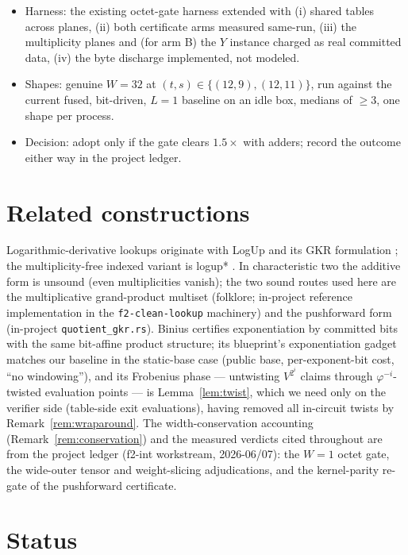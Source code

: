 \documentclass[11pt]{article}
\theoremstyle{definition}
\begin{document}
\begin{itemize}
\item Harness: the existing octet-gate harness extended with (i) shared
tables across planes, (ii) both certificate arms measured same-run,
(iii) the multiplicity planes and (for arm B) the $Y$ instance charged
as real committed data, (iv) the byte discharge implemented, not
modeled.
\item Shapes: genuine $W{=}32$ at $(t,s)\in\{(12,9),(12,11)\}$, run
against the current fused, bit-driven, $L{=}1$ baseline on an idle box,
medians of $\ge 3$, one shape per process.
\item Decision: adopt only if the gate clears $1.5\times$ with adders;
record the outcome either way in the project ledger.
\end{itemize}

\section{Related constructions}\label{sec:related}

Logarithmic-derivative lookups originate with LogUp \cite{logup} and its
GKR formulation \cite{logupgkr}; the multiplicity-free indexed variant
is logup* \cite{logupstar}. In characteristic two the additive form is
unsound (even multiplicities vanish); the two sound routes used here are
the multiplicative grand-product multiset (folklore; in-project
reference implementation in the \texttt{f2-clean-lookup} machinery) and
the pushforward form (in-project \texttt{quotient\_gkr.rs}). Binius
\cite{binius} certifies exponentiation by committed bits with the same
bit-affine product structure; its blueprint's exponentiation gadget
\cite{biniusblueprint} matches our baseline in the static-base case
(public base, per-exponent-bit cost, ``no windowing''), and its
Frobenius phase --- untwisting $V^{2^i}$ claims through
$\varphi^{-i}$-twisted evaluation points --- is Lemma~\ref{lem:twist},
which we need only on the verifier side (table-side exit evaluations),
having removed all in-circuit twists by Remark~\ref{rem:wraparound}.
The width-conservation accounting (Remark~\ref{rem:conservation}) and
the measured verdicts cited throughout are from the project ledger
(f2-int workstream, 2026-06/07): the $W{=}1$ octet gate, the wide-outer
tensor and weight-slicing adjudications, and the kernel-parity re-gate
of the pushforward certificate.

\section{Status}\label{sec:status}
\end{document}
